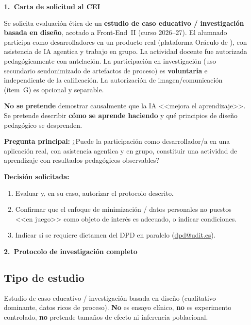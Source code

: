 \documentclass[11pt,a4paper]{scrartcl}
\newcommand{\AnnexTitle}[1]{%
  \clearpage
  \LogoRow
  \begin{center}{\Large\sffamily\bfseries #1}\end{center}
  \vspace{0.4em}
  \noindent{\color{rulegray}\hrule height 0.4pt}
  \vspace{0.5em}
}
\begin{document}
\AnnexTitle{1.\ Carta de solicitud al CEI}

Se solicita evaluación ética de un \textbf{estudio de caso educativo / investigación
basada en diseño}, acotado a Front-End~II (curso 2026--27). El alumnado participa
como desarrolladores en un producto real (plataforma Oráculo de \TTODfull), con asistencia
de IA agentica y trabajo en grupo. La actividad docente fue autorizada
pedagógicamente con antelación. La participación en investigación (uso secundario
seudonimizado de artefactos de proceso) es \textbf{voluntaria} e independiente de
la calificación. La autorización de imagen/comunicación (ítem~G) es opcional y separable.

\textbf{No se pretende} demostrar causalmente que la IA <<mejora el aprendizaje>>.
Se pretende describir \textbf{cómo se aprende haciendo} y qué principios de diseño
pedagógico se desprenden.

\textbf{Pregunta principal:} ¿Puede la participación como desarrollador/a en una
aplicación real, con asistencia agentica y en grupo, constituir una actividad de
aprendizaje con resultados pedagógicos observables?

\textbf{Decisión solicitada:}
\begin{enumerate}
  \item Evaluar y, en su caso, autorizar el protocolo descrito.
  \item Confirmar que el enfoque de minimización / datos personales no puestos
        <<en juego>> como objeto de interés es adecuado, o indicar condiciones.
  \item Indicar si se requiere dictamen del DPD en paralelo
        (\href{mailto:dpd@udit.es}{dpd@udit.es}).
\end{enumerate}

\AnnexTitle{2.\ Protocolo de investigación completo}

\subsection*{Tipo de estudio}
Estudio de caso educativo / investigación basada en diseño (cualitativo dominante,
datos ricos de proceso). \textbf{No} es ensayo clínico, \textbf{no} es experimento
controlado, \textbf{no} pretende tamaños de efecto ni inferencia poblacional.
\end{document}
